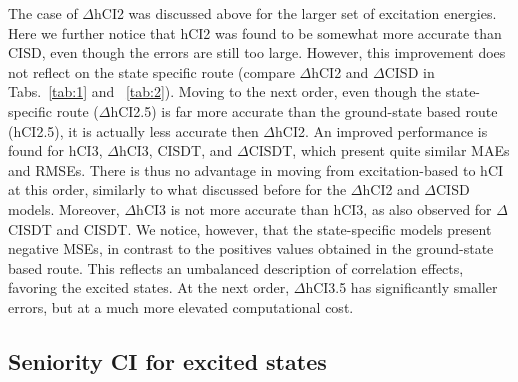 \documentclass[aip,jcp,reprint,noshowkeys,superscriptaddress]{revtex4-1}
\begin{document}
The case of $\Delta$hCI2 was discussed above for the larger set of excitation energies.
Here we further notice that hCI2 was found to be somewhat more accurate than CISD, even though the errors are still too large.
However, this improvement does not reflect on the state specific route (compare $\Delta$hCI2 and $\Delta$CISD in Tabs.~\ref{tab:1} and ~\ref{tab:2}).
Moving to the next order, even though the state-specific route ($\Delta$hCI2.5) is far more accurate than the ground-state based route (hCI2.5),
it is actually less accurate then $\Delta$hCI2.
An improved performance is found for hCI3, $\Delta$hCI3, CISDT, and $\Delta$CISDT, which present quite similar MAEs and RMSEs.
There is thus no advantage in moving from excitation-based to hCI at this order, similarly to what discussed before for the $\Delta$hCI2 and $\Delta$CISD models.
Moreover, $\Delta$hCI3 is not more accurate than hCI3, as also observed for $\Delta$CISDT and CISDT. \cite{Kossoski_2023}
We notice, however, that the state-specific models present negative MSEs, in contrast to the positives values obtained in the ground-state based route.
This reflects an umbalanced description of correlation effects, favoring the excited states.
At the next order, $\Delta$hCI3.5 has significantly smaller errors, but at a much more elevated computational cost.


\subsection{Seniority CI for excited states}
\label{sec:res_C}
\end{document}
